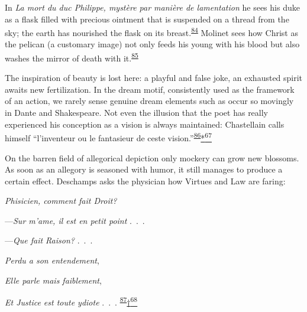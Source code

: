 In \emph{La mort du duc Philippe, mystère par manière de lamentation} he
sees his duke as a flask filled with precious ointment that is suspended
on a thread from the sky; the earth has nourished the flask on its
breast.\textsuperscript{\protect\hypertarget{21_Chapter_Thirteen__IMAGE_AND_WORD.xhtmlux5cux23id_144}{\protect\hyperlink{23_NOTES.xhtmlux5cux23id_145}{84}}}
Molinet sees how Christ as the pelican (a customary image) not only
feeds his young with his blood but also washes the mirror of death with
it.\textsuperscript{\protect\hypertarget{21_Chapter_Thirteen__IMAGE_AND_WORD.xhtmlux5cux23id_142}{\protect\hyperlink{23_NOTES.xhtmlux5cux23id_143}{85}}}

The inspiration of beauty is lost here: a playful and false joke, an
exhausted spirit awaits new fertilization. In the dream motif,
consistently used as the framework of an action, we rarely sense
\protect\hypertarget{21_Chapter_Thirteen__IMAGE_AND_WORD.xhtmlux5cux23page_379}{}{}genuine
dream elements such as occur so movingly in Dante and Shakespeare. Not
even the illusion that the poet has really experienced his conception as
a vision is always maintained: Chastellain calls himself ``l'inventeur
ou le fantasieur de ceste
vision.''\textsuperscript{\protect\hypertarget{21_Chapter_Thirteen__IMAGE_AND_WORD.xhtmlux5cux23id_140}{\protect\hyperlink{23_NOTES.xhtmlux5cux23id_141}{86}}}\protect\hypertarget{21_Chapter_Thirteen__IMAGE_AND_WORD.xhtmlux5cux23id_2819}{\protect\hyperlink{23_NOTES.xhtmlux5cux23id_2820}{*\textsuperscript{67}}}

On the barren field of allegorical depiction only mockery can grow new
blossoms. As soon as an allegory is seasoned with humor, it still
manages to produce a certain effect. Deschamps asks the physician how
Virtues and Law are faring:

\emph{Phisicien, comment fait Droit?}

---\emph{Sur m'ame, il est en petit point} .~.~.

---\emph{Que fait Raison?} .~.~.

\emph{Perdu a son entendement},

\emph{Elle parle mais faiblement},

\emph{Et Justice est toute ydiote} .~.~.
\textsuperscript{\protect\hypertarget{21_Chapter_Thirteen__IMAGE_AND_WORD.xhtmlux5cux23id_138}{\protect\hyperlink{23_NOTES.xhtmlux5cux23id_139}{87}}}\protect\hypertarget{21_Chapter_Thirteen__IMAGE_AND_WORD.xhtmlux5cux23id_2817}{\protect\hyperlink{23_NOTES.xhtmlux5cux23id_2818}{†\textsuperscript{68}}}

